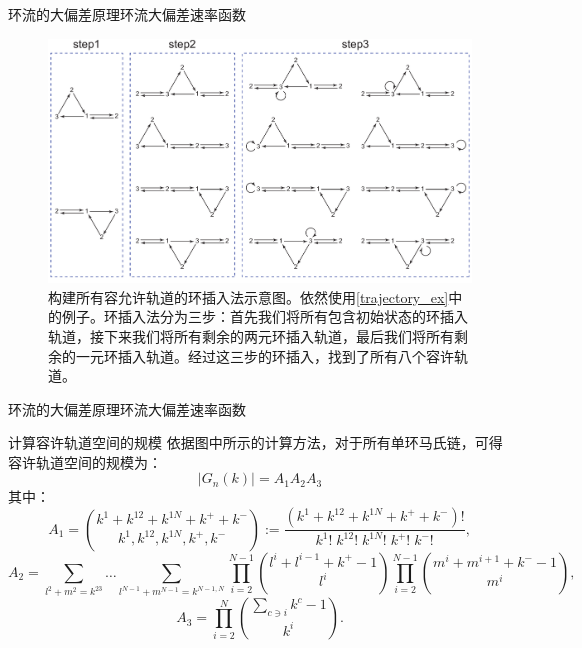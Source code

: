 \documentclass{beamer}
\begin{document}
\begin{frame}{环流的大偏差原理}{环流大偏差速率函数}
	\begin{figure}[htb!]
		\centering
		\includegraphics[scale=0.35]{chart/insertiongraph.pdf}
		\caption{{\tiny 构建所有容允许轨道的环插入法示意图。依然使用\ref{trajectory_ex}中的例子。环插入法分为三步：首先我们将所有包含初始状态的环插入轨道，接下来我们将所有剩余的两元环插入轨道，最后我们将所有剩余的一元环插入轨道。经过这三步的环插入，找到了所有八个容许轨道。}}
		\label{figure:insertion}
	\end{figure}
\end{frame}

\begin{frame}{环流的大偏差原理}{环流大偏差速率函数}
	\begin{block}{计算容许轨道空间的规模}
		依据图中所示的计算方法，对于所有单环马氏链，可得容许轨道空间的规模为：
		$$|G_n(k)|=A_1A_2A_3 $$
		其中：{\footnotesize
		\begin{equation*}\label{formula:A1}
			A_1 = \binom{k^1+k^{12}+k^{1N}+k^{+}+k^{-}}{k^1,k^{12},k^{1N},k^{+},k^{-}}
			:= \frac{(k^1+k^{12}+k^{1N}+k^{+}+k^{-})!}{k^1!\;k^{12}!\;k^{1N}!\;k^{+}!\;k^{-}!},
		\end{equation*}
		\begin{equation*}
			A_2 = \sum_{l^{2}+m^{2}=k^{23}}\dots\sum_{l^{N-1}+m^{N-1}=k^{N-1,N}}
			\prod_{i=2}^{N-1}\binom{l^{i}+l^{i-1}+k^{+}-1}{l^{i}}\prod_{i=2}^{N-1}\binom{m^{i}+m^{i+1}+k^{-}-1}{m^{i}},
		\end{equation*}
		\begin{equation*}\label{formula:A3}
			A_3 = \prod_{i=2}^N\binom{\sum_{c\ni i}k^{c}-1}{k^{i}}.
		\end{equation*}}
	\end{block}
\end{frame}
\end{document}
